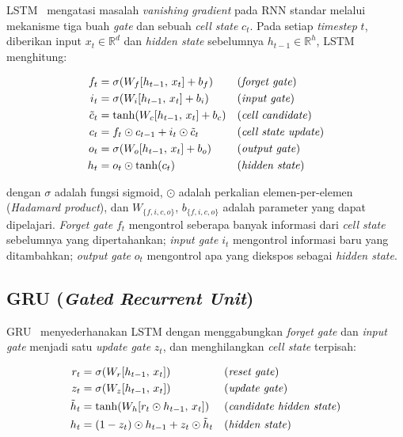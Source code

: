 \documentclass[11pt,a4paper,oneside]{report}
\begin{document}
LSTM~\cite{hochreiter1997} mengatasi masalah \textit{vanishing gradient} pada RNN standar melalui mekanisme tiga buah \textit{gate} dan sebuah \textit{cell state} $c_t$. Pada setiap \textit{timestep} $t$, diberikan input $x_t \in \mathbb{R}^{d}$ dan \textit{hidden state} sebelumnya $h_{t-1} \in \mathbb{R}^{h}$, LSTM menghitung:

\begin{align}
f_t &= \sigma\!\left(W_f [h_{t-1},\, x_t] + b_f\right) & &\text{(\textit{forget gate})} \label{eq:forget}\\
i_t &= \sigma\!\left(W_i [h_{t-1},\, x_t] + b_i\right) & &\text{(\textit{input gate})} \label{eq:input}\\
\tilde{c}_t &= \tanh\!\left(W_c [h_{t-1},\, x_t] + b_c\right) & &\text{(\textit{cell candidate})} \label{eq:candidate}\\
c_t &= f_t \odot c_{t-1} + i_t \odot \tilde{c}_t & &\text{(\textit{cell state update})} \label{eq:cell}\\
o_t &= \sigma\!\left(W_o [h_{t-1},\, x_t] + b_o\right) & &\text{(\textit{output gate})} \label{eq:output}\\
h_t &= o_t \odot \tanh(c_t) & &\text{(\textit{hidden state})} \label{eq:hidden}
\end{align}

dengan $\sigma$ adalah fungsi sigmoid, $\odot$ adalah perkalian elemen-per-elemen (\textit{Hadamard product}), dan $W_{\{f,i,c,o\}}$, $b_{\{f,i,c,o\}}$ adalah parameter yang dapat dipelajari. \textit{Forget gate} $f_t$ mengontrol seberapa banyak informasi dari \textit{cell state} sebelumnya yang dipertahankan; \textit{input gate} $i_t$ mengontrol informasi baru yang ditambahkan; \textit{output gate} $o_t$ mengontrol apa yang diekspos sebagai \textit{hidden state}.

\subsection*{GRU (\textit{Gated Recurrent Unit})}

GRU~\cite{cho2014} menyederhanakan LSTM dengan menggabungkan \textit{forget gate} dan \textit{input gate} menjadi satu \textit{update gate} $z_t$, dan menghilangkan \textit{cell state} terpisah:

\begin{align}
r_t &= \sigma\!\left(W_r [h_{t-1},\, x_t]\right) & &\text{(\textit{reset gate})} \\
z_t &= \sigma\!\left(W_z [h_{t-1},\, x_t]\right) & &\text{(\textit{update gate})} \\
\tilde{h}_t &= \tanh\!\left(W_h [r_t \odot h_{t-1},\, x_t]\right) & &\text{(\textit{candidate hidden state})} \\
h_t &= (1 - z_t) \odot h_{t-1} + z_t \odot \tilde{h}_t & &\text{(\textit{hidden state})}
\end{align}
\end{document}
